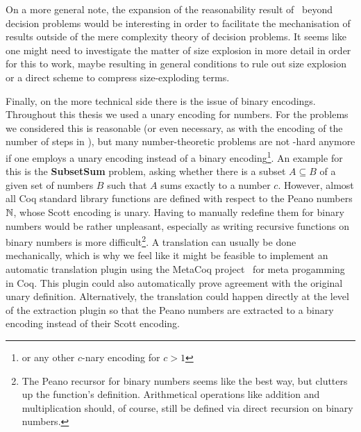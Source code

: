 On a more general note, the expansion of the reasonability result of~\cite{ForsterKunzeRoth:2019:wcbv-Reasonable} beyond decision problems would be interesting in order to facilitate the mechanisation of results outside of the mere complexity theory of decision problems. It seems like one might need to investigate the matter of size explosion in more detail in order for this to work, maybe resulting in general conditions to rule out size explosion or a direct scheme to compress size-exploding terms.

Finally, on the more technical side there is the issue of binary encodings. Throughout this thesis we used a unary encoding for numbers. For the problems we considered this is reasonable (or even necessary, as with the encoding of the number of steps in \gennp{}), but many number-theoretic problems are not \NP{}-hard anymore if one employs a unary encoding instead of a binary encoding\footnote{or any other $c$-nary encoding for $c> 1$}. An example for this is the \textbf{SubsetSum} problem, asking whether there is a subset $A \subseteq B$ of a given set of numbers $B$ such that $A$ sums exactly to a number $c$.
However, almost all Coq standard library functions are defined with respect to the Peano numbers $\mathbb{N}$, whose Scott encoding is unary.
Having to manually redefine them for binary numbers would be rather unpleasant, especially as writing recursive functions on binary numbers is more difficult\footnote{The Peano recursor for binary numbers seems like the best way, but clutters up the function's definition. Arithmetical operations like addition and multiplication should, of course, still be defined via direct recursion on binary numbers.}.
A translation can usually be done mechanically, which is why we feel like it might be feasible to implement an automatic translation plugin using the MetaCoq project~\cite{metacoq_web} for meta progamming in Coq. This plugin could also automatically prove agreement with the original unary definition.
Alternatively, the translation could happen directly at the level of the extraction plugin so that the Peano numbers are extracted to a binary encoding instead of their Scott encoding. 
